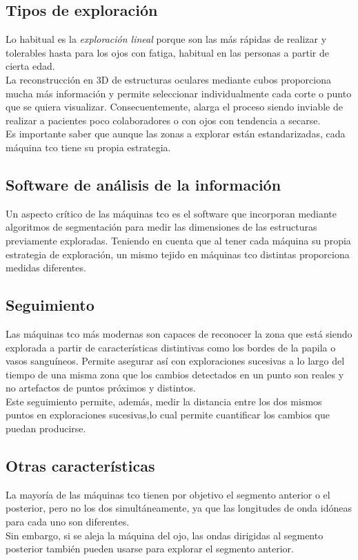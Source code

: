 \subsection{Tipos de exploración}
Lo habitual es la \emph{exploración lineal} porque son las más rápidas
de realizar y tolerables hasta para los ojos con
fatiga, habitual en las personas a partir de cierta edad.\\
La reconstrucción en 3D de estructuras oculares mediante cubos
proporciona mucha más información y permite seleccionar
individualmente cada corte o punto que se quiera
visualizar. Consecuentemente, alarga el proceso siendo inviable de
realizar a pacientes poco colaboradores o con ojos con tendencia a
secarse.\\
Es importante saber que aunque las zonas a explorar están
estandarizadas, cada máquina \gls{tco} tiene su propia estrategia.

\subsection{Software de análisis de la información}
Un aspecto crítico de las máquinas \gls{tco} es el software que
incorporan mediante algoritmos de segmentación para medir las
dimensiones de las estructuras previamente exploradas. Teniendo en
cuenta que al tener cada máquina su propia estrategia de exploración,
un mismo tejido en máquinas \gls{tco} distintas proporciona medidas
diferentes.

\subsection{Seguimiento}
Las máquinas \gls{tco} más modernas son capaces de reconocer la zona
que está siendo explorada a partir de características distintivas como
los bordes de la papila o vasos sanguíneos. Permite asegurar así con
exploraciones sucesivas a lo largo del tiempo de una misma zona que
los cambios detectados en un punto son reales y no artefactos de
puntos próximos y distintos.\\
Este seguimiento permite, además, medir la distancia entre los dos
mismos puntos en exploraciones sucesivas,lo cual permite cuantificar
los cambios que puedan producirse.

\subsection{Otras características}
La mayoría de las máquinas \gls{tco} tienen por objetivo el segmento
anterior o el posterior, pero no los dos simultáneamente, ya que
las longitudes de onda idóneas para cada uno son diferentes.\\
Sin embargo, si se aleja la máquina del ojo, las ondas dirigidas al
segmento posterior también pueden usarse para explorar el segmento
anterior.


